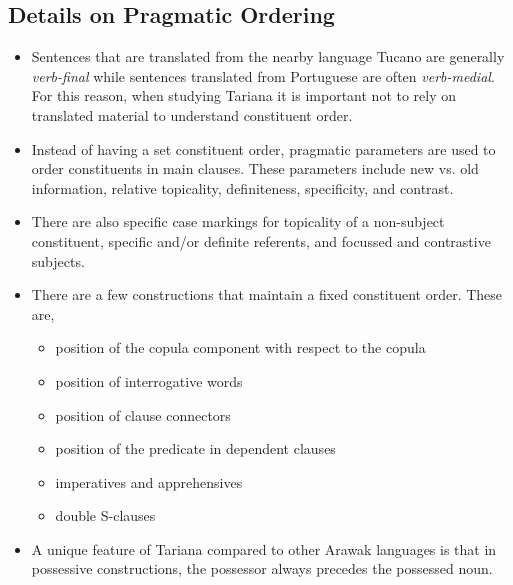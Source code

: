\documentclass[12pt]{article}
\begin{document}
\subsection{Details on Pragmatic Ordering}
\begin{itemize}
  \item Sentences that are translated from the nearby language Tucano are generally \textit{verb-final} while sentences translated from Portuguese are often \textit{verb-medial}. For this reason, when studying Tariana it is important not to rely on translated material to understand constituent order.

  \item Instead of having a set constituent order, pragmatic parameters are used to order constituents in main clauses. These parameters include new vs. old information, relative topicality, definiteness, specificity, and contrast.

  \item There are also specific case markings for topicality of a non-subject constituent, specific and/or definite referents, and focussed and contrastive subjects.


  \item There are a few constructions that maintain a fixed constituent order. These are,
  \begin{itemize}
    \item position of the copula component with respect to the copula
    \item position of interrogative words
    \item position of clause connectors
    \item position of the predicate in dependent clauses
    \item imperatives and apprehensives
    \item double S-clauses
  \end{itemize}

  \item A unique feature of Tariana compared to other Arawak languages is that in possessive constructions, the possessor always precedes the possessed noun.

\end{itemize}
\end{document}
